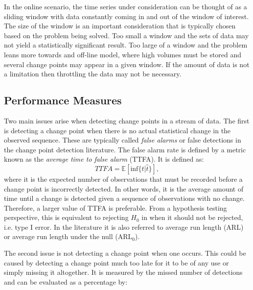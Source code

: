 In the online scenario, the time series under consideration can be thought of as a sliding window with data constantly coming in and out of the window of interest. The size of the window is an important consideration that is typically chosen based on the problem being solved. Too small a window and the sets of data may not yield a statistically significant result. Too large of a window and the problem leans more towards and off-line model, where high volumes must be stored and several change points may appear in a given window. If the amount of data is not a limitation then throttling the data may not be necessary.

\subsection{Performance Measures}

Two main issues arise when detecting change points in a stream of data. The first is detecting a change point when there is no actual statistical change in the observed sequence. These are typically called \textit{false alarms} or false detections in the change point detection literature. The false alarm rate is defined by a metric known as the \textit{average time to false alarm} (TTFA).   It is defined as:
\begin{equation}
TTFA = \mathbb{E}[\text{inf} \{t | \hat{t} \}],
\end{equation}
where it is the expected number of observations that must be recorded before a change point is incorrectly detected. In other words, it is the average amount of time until a change is detected given a sequence of observations with no change. Therefore, a larger value of TTFA is preferable. From a hypothesis testing perspective, this is equivalent to rejecting $H_0$ in  when it should not be rejected, i.e. type I error. In the literature it is also referred to average run length (ARL) or average run length under the null (ARL$_0$). 

The second issue is not detecting a change point when one occurs. This could be caused by detecting a change point much too late for it to be of any use or simply missing it altogether. It is measured by the missed number of detections and can be evaluated as a percentage by:

